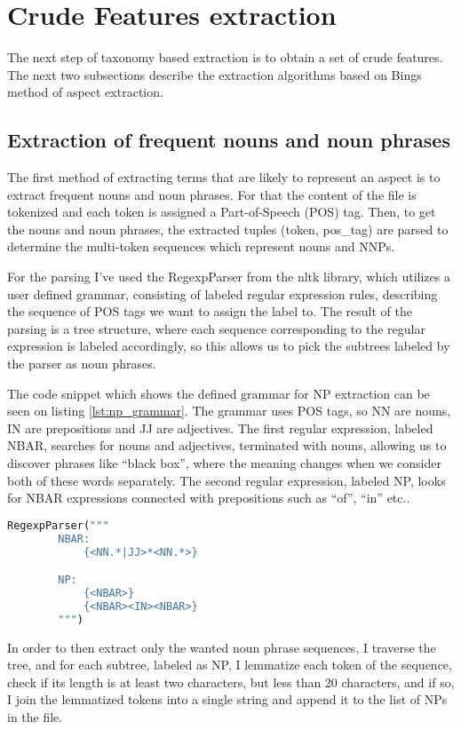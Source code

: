 \section{Crude Features extraction}
The next step of taxonomy based extraction is to obtain a set of crude features. The next two subsections describe the extraction algorithms based on Bings method of aspect extraction.

\subsection{Extraction of frequent nouns and noun phrases}
The first method of extracting terms that are likely to represent an aspect is to extract frequent nouns and noun phrases. For that the content of the file is tokenized and each token is assigned a Part-of-Speech (POS) tag. Then, to get the nouns and noun phrases, the extracted tuples (token, pos\_tag) are parsed to determine the multi-token sequences which represent nouns and NNPs. 

For the parsing I've used the RegexpParser from the nltk library, which utilizes a user defined grammar, consisting of labeled regular expression rules, describing the sequence of POS tags we want to assign the label to. The result of the parsing is a tree structure, where each sequence corresponding to the regular expression is labeled accordingly, so this allows us to pick the subtrees labeled by the parser as noun phrases. 

The code snippet which shows the defined grammar for NP extraction can be seen on listing \ref{lst:np_grammar}. 
The grammar uses POS tags, so NN are nouns, IN are prepositions and JJ are adjectives. The first regular expression, labeled NBAR, searches for nouns and adjectives, terminated with nouns, allowing us to discover phrases like ``black box'', where the meaning changes when we consider both of these words separately. The second regular expression, labeled NP, looks for NBAR expressions connected with prepositions such as ``of'', ``in'' etc.. \cite{nltk_np}

\begin{lstlisting}[language=python,caption={Grammar for the extraction of noun phrases.}, label={lst:np_grammar}]
RegexpParser("""
        NBAR:
            {<NN.*|JJ>*<NN.*>} 

        NP:
            {<NBAR>}
            {<NBAR><IN><NBAR>}
        """)
\end{lstlisting}

In order to then extract only the wanted noun phrase sequences, I traverse the tree, and for each subtree, labeled as NP, I lemmatize each token of the sequence, check if its length is at least two characters, but less than 20 characters, and if so, I join the lemmatized tokens into a single string and append it to the list of NPs in the file.

